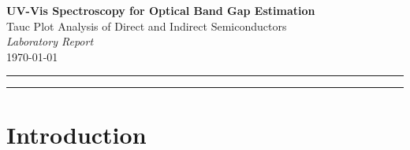 \documentclass[12pt,a4paper]{article}
\newcommand{\Eg}{E_{\mathrm{g}}}
\newcommand{\hnu}{h\nu}
\begin{document}
\begin{center}
  {\LARGE\bfseries UV-Vis Spectroscopy for Optical Band Gap Estimation}\\[0.6em]
  {\large Tauc Plot Analysis of Direct and Indirect Semiconductors}\\[1.2em]
  {\normalsize\itshape Laboratory Report}\\[0.3em]
  {\small \today}
\end{center}

\vspace{0.5em}
\noindent\rule{\linewidth}{0.6pt}
\vspace{0.4em}

\begin{abstract}
\noindent
The optical band gaps of four direct-gap semiconductor thin films (CdS, TiO$_2$, ZnO,
ZnTe) and one indirect-gap Si-based polymer film were estimated using the Tauc plot
method from UV-Vis absorbance data. The absorption coefficient $\alpha$ was extracted
via the Beer–Lambert law. For direct transitions ($\alpha^2 \propto \hnu - \Eg$), linear
extrapolation of $\alpha^2$ vs.\ $\hnu$ yields the band gap; for indirect transitions
($\sqrt{\alpha} \propto \hnu - \Eg$), the same procedure is applied to $\sqrt{\alpha}$.
Extracted band gaps: CdS $\approx \SI{1.81}{eV}$, ZnTe $\approx \SI{1.92}{eV}$,
ZnO $\approx \SI{3.61}{eV}$, and Si-polymer
$\Eg = \SI[parse-numbers=false]{1.345 \pm 0.071}{eV}$.
TiO$_2$ data were saturated at the detector limit.
Full error propagation and comparison with literature values are reported.
The Python code for the analysis is available at:
\begin{center}
  \url{https://github.com/YOUR_USERNAME/bandgap-uvvis}   %
\end{center}
\end{abstract}

\vspace{0.4em}
\noindent\rule{\linewidth}{0.4pt}
\vspace{0.2em}

\section{Introduction}
\end{document}
